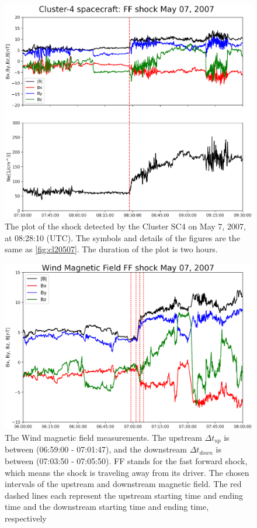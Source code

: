 \documentclass[draft]{agujournal2019}
\begin{document}
\pagebreak

\begin{figure}[!t]
\centering
\includegraphics[width=1.\textwidth]{jgr-2023-ipshocks-f07.eps}
\caption{The plot of the shock detected by the Cluster SC4 on May 7, 2007, at 08:28:10 (UTC). The symbols and details of the figures are the same as \ref{fig:cl20507}. The duration of the plot is two hours.}
\label{fig:cl40507}
\end{figure}

\pagebreak

\begin{figure}[!t]
\centering
\includegraphics[width=1\textwidth]{jgr-2023-ipshocks-f08.eps}
\caption{The Wind magnetic field measurements. The upstream $\Delta t_{up}$ is between (06:59:00 - 07:01:47), and the downstream $\Delta t_{down}$ is between (07:03:50 - 07:05:50). FF stands for the fast forward shock, which means the shock is traveling away from its driver. The chosen intervals of the upstream and downstream magnetic field. The red dashed lines each represent the upstream starting time and ending time and the downstream starting time and ending time, respectively}
\label{fig:WindB}
\end{figure}
\end{document}
